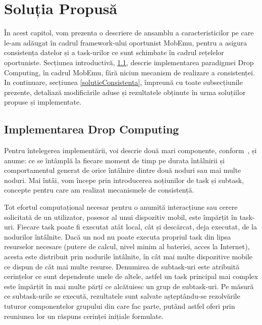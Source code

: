 \documentclass[12pt,a4paper]{report}
\begin{document}
\chapter{Soluția Propusă} \label{solutiaPropusa}

În acest capitol, vom prezenta o descriere de ansamblu a caracteristicilor pe care le-am adăugat în cadrul framework-ului oportunist MobEmu, pentru a asigura consistența datelor și a task-urilor ce sunt schimbate în cadrul rețelelor oportuniste. 
Secțiunea introductivă, \ref{dropcomputing}, descrie implementarea paradigmei Drop Computing, în cadrul MobEmu, fără niciun mecanism de realizare a consistenței. In continuare, secțiunea \ref{solutieConsistenta}, împreună cu toate subsecțiunile prezente, detaliază modificările aduse și rezultatele obținute în urma soluțiilor propuse și implementate.

\section{Implementarea Drop Computing} \label{dropcomputing}
Pentru întelegerea implementării, voi descrie două mari componente, conform~\cite{MobEmuArticle},  și anume: ce se întâmplă la fiecare moment de timp pe durata întâlnirii și comportamentul generat de orice întâlnire dintre două noduri sau mai multe noduri. Mai întâi, vom începe prin introducerea noțiunilor de task și subtask, concepte pentru care am realizat mecanismele de consistență.

Tot efortul computațional necesar pentru o anumită interacțiune sau cerere solicitată de un utilizator, posesor al unui dispozitiv mobil, este împărțit în task-uri. Fiecare task poate fi executat atât local, cât și descărcat, deja executat, de la nodurilor întâlnite. Dacă un nod nu poate executa propriul task din lipsa resurselor necesare (putere de calcul, nivel minim al bateriei, acces la Internet), acesta este distribuit prin nodurile întâlnite, în cât mai multe dispozitive mobile ce dispun de cât mai multe resurse. Denumirea de subtask-uri este atribuită cerințelor ce sunt dependente unele de altele, astfel un task principal mai complex este împărțit în mai multe părți ce alcătuiesc un grup de subtask-uri. Pe măsură ce subtask-urile se execută, rezultatele sunt salvate așteptându-se rezolvările tuturor componentelor grupului din care fac parte, putând astfel oferi prin reuniunea lor un răspuns cerinței inițiale formulate. 
\end{document}
